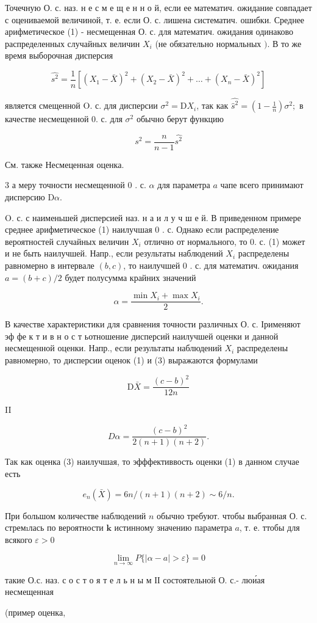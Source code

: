 \documentclass[10pt]{article}
\begin{document}
Точечную О. с. наз. н е с м е щ е н н о й, если ее математич. ожидание совпадает с оцениваемой величиной, т. е. если О. с. лишена систематич. ошибки. Среднее арифметическое (1) - несмещенная О. с. для математич. ожидания одинаково распределенных случайных величин $X_{i}$ (не обязательно нормальных $)$. В то же время выборочная дисперсия

\[
\hat{s^{2}}=\frac{1}{n}\left[\left(X_{1}-\bar{X}\right)^{2}+\left(X_{2}-\bar{X}\right)^{2}+\ldots+\left(X_{n}-\bar{X}\right)^{2}\right]
\]

является смещенной $\mathrm{O}$. с. для дисперсии $\sigma^{2}=\mathrm{D} X_{i}$, так как $\hat{\hat{s}^{2}}=\left(1-\frac{1}{n}\right) \sigma^{2} ;$ в качестве несмещенной 0. с. для $\sigma^{2}$ обычно берут функцию

\[
s^{2}=\frac{n}{n-1} \hat{s^{2}}
\]

См. также Несмеценная оценка.

3 а меру точности несмещенной 0 . с. $\alpha$ для параметра $a$ чапе всего принимают дисперсию $\mathrm{D} \alpha$.

O. с. с наименьшей дисперсией наз. н а и л у ч ш е й. В приведенном примере среднее арифметическое (1) наилучшая 0 . с. Однако если распределение вероятностей случайных величин $X_{i}$ отлично от нормального, то 0. с. (1) может и не быть наилучшей. Напр., если результаты наблюдений $X_{i}$ распределены равномерно в интервале $(b, c)$, то наилучшей 0 . с. для математич. ожидания $a=(b+c) / 2$ будет полусумма крайних значений

\[
\alpha=\frac{\min X_{i}+\max X_{i}}{2} .
\]

В качестве характеристики для сравнения точности различных О. с. Ірименяют эф фе к т и в н о с т ьотношение дисперсий наилучшей оценки и данной несмещенной оценки. Напр., если результаты наблюдений $X_{i}$ распределены равномерно, то дисперсии оценок (1) и (3) выражаются формулами

\[
\mathrm{D} \bar{X}=\frac{(c-b)^{2}}{12 n}
\]

II

\[
D \alpha=\frac{(c-b)^{2}}{2(n+1)(n+2)} .
\]

Так как оценка (3) наилучшая, то эфффективвость оценки (1) в данном случае есть

\[
e_{n}(\bar{X})=6 n /(n+1)(n+2) \sim 6 / n .
\]

При большом количестве наблюдений $n$ обычно требуют. чтобы выбранная О. с. стремıлась по вероятности $\mathbf{k}$ истинному значению параметра $a$, т. е. ттобы для всякого $\varepsilon>0$

\[
\lim _{n \rightarrow \infty} P\{|\alpha-a|>\varepsilon\}=0
\]

такие О.с. наз. с о с т о я т е л ь н ы м ІІ состоятельной О. с.- люи́ая несмещенная

(пример оценка,
\end{document}
